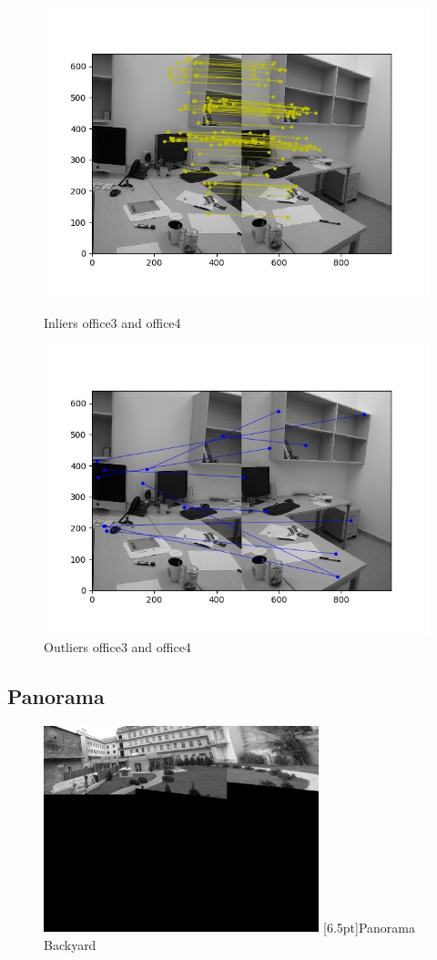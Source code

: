 \documentclass[12pt,a4paper]{report}
\begin{document}
\begin{figure}[!htb]
  \includegraphics[width=\linewidth]{outMatches_inlier_office3}
        \caption{Inliers office3 and office4}
\endminipage\hfill
{}
  \includegraphics[width=\linewidth]{outMatches_outlier_office3}
        \caption{Outliers office3 and office4}
\endminipage\hfill
\end{figure}

\newpage
\subsection*{Panorama}
\begin{figure}[!htb]
\centering
\includegraphics[width=8cm]{panorama1}
[6.5pt]{Panorama Backyard}
\end{figure}
\end{document}

